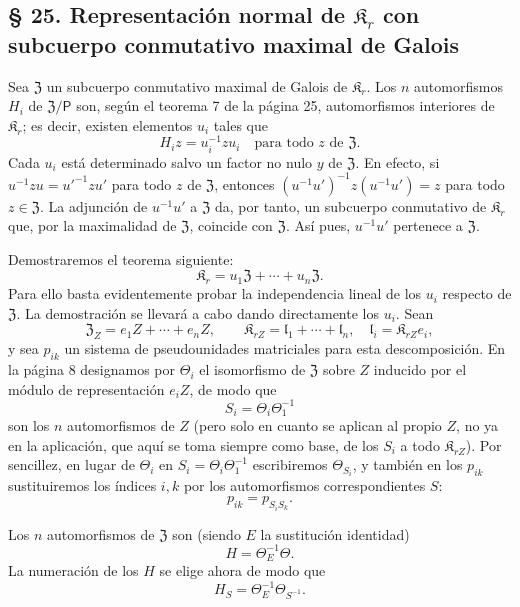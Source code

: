 \subsection*{§ 25. Representación normal de \(\mathfrak K_r\) con subcuerpo conmutativo maximal de Galois\protect\footnotemark}
\label{normaldarstellung-von-r_r-mit-galoisschem-maximalem-kommutativem-teilkoerper-1}

Sea \(\mathfrak Z\) un subcuerpo conmutativo maximal de Galois de \(\mathfrak K_r\). Los \(n\) automorfismos \(H_i\) de \(\mathfrak Z/\mathsf P\) son, según el teorema 7 de la página 25, automorfismos interiores de \(\mathfrak K_r\); es decir, existen elementos \(u_i\) tales que
\[
H_i z=u_i^{-1}zu_i\quad\text{para todo }z\text{ de }\mathfrak Z.
\]
Cada \(u_i\) está determinado salvo un factor no nulo \(y\) de \(\mathfrak Z\). En efecto, si \(u^{-1}zu=u'^{-1}zu'\) para todo \(z\) de \(\mathfrak Z\), entonces \((u^{-1}u')^{-1}z(u^{-1}u')=z\) para todo \(z\in\mathfrak Z\). La adjunción de \(u^{-1}u'\) a \(\mathfrak Z\) da, por tanto, un subcuerpo conmutativo de \(\mathfrak K_r\) que, por la maximalidad de \(\mathfrak Z\), coincide con \(\mathfrak Z\). Así pues, \(u^{-1}u'\) pertenece a \(\mathfrak Z\).

Demostraremos el teorema siguiente:
\[
\mathfrak K_r=u_1\mathfrak Z+\cdots+u_n\mathfrak Z.
\]
Para ello basta evidentemente probar la independencia lineal de los \(u_i\) respecto de \(\mathfrak Z\). La demostración se llevará a cabo dando directamente los \(u_i\). Sean
\[
\mathfrak Z_Z=e_1Z+\cdots+e_nZ,\qquad
\mathfrak K_{rZ}=\mathfrak l_1+\cdots+\mathfrak l_n,\quad
\mathfrak l_i=\mathfrak K_{rZ}e_i,
\]
y sea \(p_{ik}\) un sistema de pseudounidades matriciales para esta descomposición. En la página 8 designamos por \(\Theta_i\) el isomorfismo de \(\mathfrak Z\) sobre \(Z\) inducido por el módulo de representación \(e_iZ\), de modo que
\[
S_i=\Theta_i\Theta_1^{-1}
\]
son los \(n\) automorfismos de \(Z\) (pero solo en cuanto se aplican al propio \(Z\), no ya en la aplicación, que aquí se toma siempre como base, de los \(S_i\) a todo \(\mathfrak K_{rZ}\)). Por sencillez, en lugar de \(\Theta_i\) en \(S_i=\Theta_i\Theta_1^{-1}\) escribiremos \(\Theta_{S_i}\), y también en los \(p_{ik}\) sustituiremos los índices \(i,k\) por los automorfismos correspondientes \(S\):
\[
p_{ik}=p_{S_iS_k}.
\]

Los \(n\) automorfismos de \(\mathfrak Z\) son (siendo \(E\) la sustitución identidad)
\[
H=\Theta_E^{-1}\Theta.
\]
La numeración de los \(H\) se elige ahora de modo que
\[
H_S=\Theta_E^{-1}\Theta_{S^{-1}}.
\]

